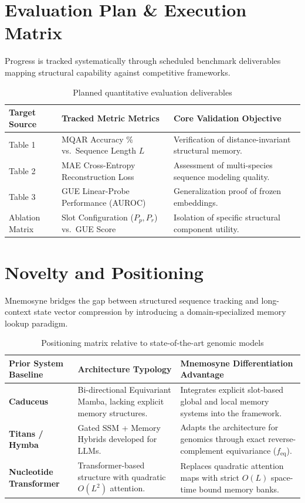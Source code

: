 \documentclass[11pt,a4paper]{article}
\begin{document}
\section{Evaluation Plan \& Execution Matrix}
Progress is tracked systematically through scheduled benchmark deliverables mapping structural capability against competitive frameworks.

\begin{table}[h]
\centering
\caption{Planned quantitative evaluation deliverables}
\label{tab:deliverables}
\begin{tabular}{@{}lp{5.2cm}p{6.0cm}@{}}
\toprule
Target Source & Tracked Metric Metrics & Core Validation Objective \\
\midrule
Table 1 & MQAR Accuracy \% vs.\ Sequence Length $L$ & Verification of distance-invariant structural memory. \\
Table 2 & MAE Cross-Entropy Reconstruction Loss & Assessment of multi-species sequence modeling quality. \\
Table 3 & GUE Linear-Probe Performance (AUROC) & Generalization proof of frozen embeddings. \\
Ablation Matrix & Slot Configuration ($P_p, P_r$) vs.\ GUE Score & Isolation of specific structural component utility. \\
\bottomrule
\end{tabular}
\end{table}

\section{Novelty and Positioning}
Mnemosyne bridges the gap between structured sequence tracking and long-context state vector compression by introducing a domain-specialized memory lookup paradigm.

\begin{table}[h]
\centering
\caption{Positioning matrix relative to state-of-the-art genomic models}
\label{tab:positioning}
\begin{tabular}{@{}p{3.8cm}p{5.4cm}p{5.8cm}@{}}
\toprule
Prior System Baseline & Architecture Typology & Mnemosyne Differentiation Advantage \\
\midrule
\textbf{Caduceus} & Bi-directional Equivariant Mamba, lacking explicit memory structures. & Integrates explicit slot-based global and local memory systems into the framework. \\[8pt]
\textbf{Titans / Hymba} & Gated SSM + Memory Hybrids developed for LLMs. & Adapts the architecture for genomics through exact reverse-complement equivariance ($f_{\mathrm{eq}}$). \\[8pt]
\textbf{Nucleotide Transformer} & Transformer-based structure with quadratic $O(L^2)$ attention. & Replaces quadratic attention maps with strict $O(L)$ space-time bound memory banks. \\
\bottomrule
\end{tabular}
\end{table}
\end{document}
